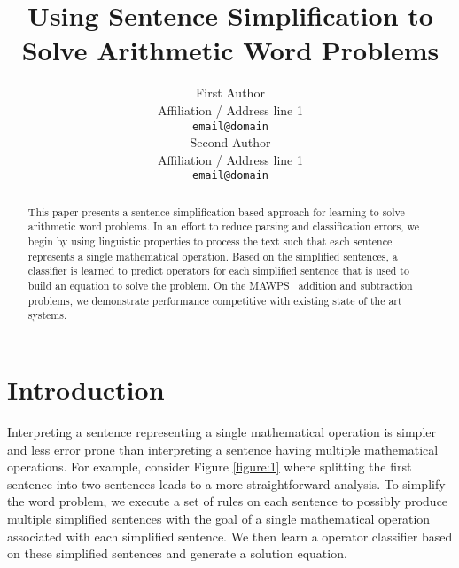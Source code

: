 \documentclass[11pt]{article}
\begin{document}
\nocite{MARTHA, Vickrey, Clark, Quants, Hannaneh}

\title{Using Sentence Simplification to Solve Arithmetic Word Problems}

\author{First Author \\
  Affiliation / Address line 1 \\
  {\tt email@domain} \\\And
  Second Author \\
  Affiliation / Address line 1 \\
  {\tt email@domain} \\}

\date{}
\maketitle

\begin{abstract}
This paper presents a sentence simplification based approach for learning to solve arithmetic word problems. In an effort to reduce parsing and classification errors, we begin by using linguistic properties to process the text such that each sentence represents a single mathematical operation.  Based on the simplified sentences, a classifier is learned to predict operators for each simplified sentence that is used to build an equation to solve the problem. On the MAWPS~\cite{MAWPS} addition and subtraction problems, we demonstrate performance competitive with existing state of the art systems. 
\end{abstract}

\section{Introduction}
Interpreting a sentence representing a single mathematical operation is simpler and less error prone than interpreting a sentence having multiple mathematical operations. For example, consider Figure \ref{figure:1} where splitting the first sentence into two sentences leads to a more straightforward analysis.  To simplify the word problem, we execute a set of rules on each sentence to possibly produce multiple simplified sentences with the goal of a single mathematical operation associated with each simplified sentence.  We then learn a operator classifier based on these simplified sentences and generate a solution equation.
\end{document}
